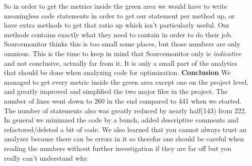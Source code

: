 \documentclass{article}
\begin{document}
So in order to get the metrics inside the green area we would have to
write meaningless code statements in order to get our statement per method up,
or have extra methods to get that ratio up which isn't particularly useful. Our
methods contains exactly what they need to contain in order to do their job. Sourcemonitor
thinks this is too small some places, but those numbers are only omnious. 
This is the time to keep in mind that Sourcemonitor only is \textit{indicative}
and not conclusive, actually far from it. It is only a small part of the analytics
that should be done when analyzing code for optimization. \newline
\textbf{Conclusion}
We managed to get every metric inside the green area except one on the project level, and
greatly improved and simplified the two major files in the project. The number of lines went down to 260 in the end compared to 441 when we started. The number of statements also was greatly reduced by nearly half(143) from 222. In general we minimzed the code by a bunch, added descriptive comments and refactored/deleted a bit of code. We also learned that you cannot always trust an analyzer because there can be errors in it so therefor one should be careful when reading the numbers without further investigation if they are far off but you really can't understand why. 

\end{document}
